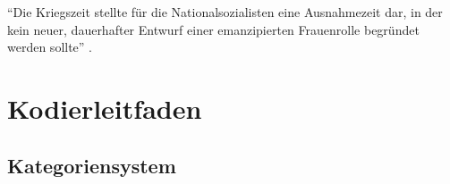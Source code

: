 \documentclass[12pt, titlepage=true, toc=bib]{scrartcl}
\begin{document}
{"`Die Kriegszeit stellte für die Nationalsozialisten eine Ausnahmezeit dar, in der kein neuer, dauerhafter Entwurf einer emanzipierten Frauenrolle begründet werden sollte"' \cite[278]{scheidgen_frauenbilder_2015}.

\newpage

\nocite{medici_faschistische_1941}
\nocite{a._v._s._kameradschaft_1936}
\nocite{maltzahn_deutsche_1936}
\nocite{reimer_glucklich_1941}
\nocite{scholtz-klink_frauen_1936}
\nocite{weinhandl_wie_1941}
\nocite{friewart_japanisches_1941}


\printbibheading[title=Literaturverzeichnis]
\printbibliography[heading=subbibliography, keyword={Quelle}, title={Quellen}]
\printbibliography[heading=subbibliography, notkeyword={Quelle}]
\newpage

\appendix

\addpart{\appendixname}

\section{Kodierleitfaden}

\subsection*{Kategoriensystem}

{\raggedright

}}
\end{document}
